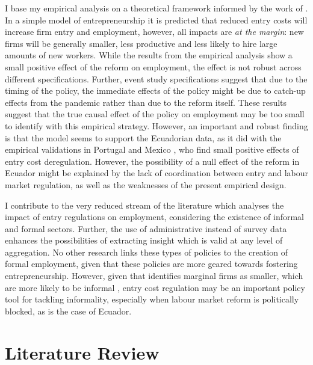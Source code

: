\documentclass[11pt,a4paper]{article}\usepackage[]{graphicx}\usepackage[]{xcolor}
\begin{document}
I base my empirical analysis on a theoretical framework informed by the work of \textcite{Branstetter.2014}. In a simple model of entrepreneurship it is predicted that reduced entry costs will increase firm entry and employment, however, all impacts are \textit{at the margin}: new firms will be generally smaller, less productive and less likely to hire large amounts of new workers. While the results from the empirical analysis show a small positive effect of the reform on employment, the effect is not robust across different specifications. Further, event study specifications suggest that due to the timing of the policy, the immediate effects of the policy might be due to catch-up effects from the pandemic rather than due to the reform itself. These results suggest that the true causal effect of the policy on employment may be too small to identify with this empirical strategy. However, an important and robust finding is that the model seems to support the Ecuadorian data, as it did with the empirical validations in Portugal \parencite{Branstetter.2014} and Mexico \parencite{Kaplan.2011}, who find small positive effects of entry cost deregulation. However, the possibility of a null effect of the reform in Ecuador might be explained by the lack of coordination between entry and labour market regulation, as well as the weaknesses of the present empirical design.

I contribute to the very reduced stream of the literature which analyses the impact of entry regulations on employment, considering the existence of informal and formal sectors. Further, the use of administrative instead of survey data enhances the possibilities of extracting insight which is valid at any level of aggregation. No other research links these types of policies to the creation of formal employment, given that these policies are more geared towards fostering entrepreneurship. However, given that \textcite{Branstetter.2014} identifies marginal firms as smaller, which are more likely to be informal \parencite{ElianeElBadaoui.2010}, entry cost regulation may be an important policy tool for tackling informality, especially when labour market reform is politically blocked, as is the case of Ecuador. 

\section{Literature Review}
\end{document}
